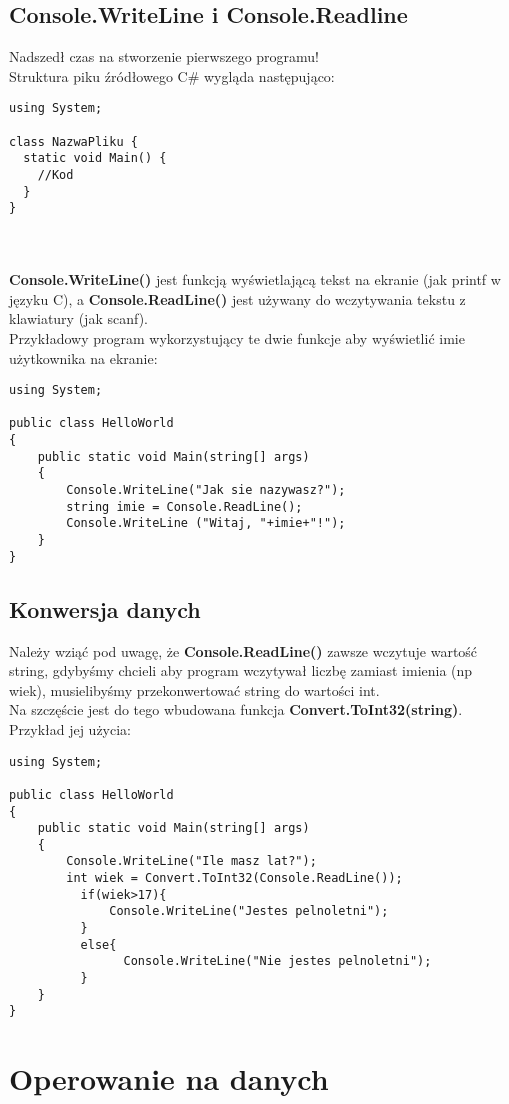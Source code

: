 \documentclass[a4paper]{article}
\theoremstyle{definition}
\begin{document}
\subsection{Console.WriteLine i Console.Readline}
Nadszedł czas na stworzenie pierwszego programu!
\\Struktura piku źródłowego C\# wygląda następująco:
\lstset{language=C}
\begin{lstlisting}[frame=single]
using System;

class NazwaPliku {
  static void Main() {
    //Kod
  }
}
\end{lstlisting}
\\	\\\textbf{Console.WriteLine()} jest funkcją wyświetlającą tekst na ekranie (jak printf w języku C), a \textbf{Console.ReadLine()} jest używany do wczytywania tekstu z klawiatury (jak scanf).
\\Przykładowy program wykorzystujący te dwie funkcje aby wyświetlić imie użytkownika na ekranie:
\lstset{language=C}
\begin{lstlisting}[frame=single]
using System;

public class HelloWorld
{
    public static void Main(string[] args)
    {
        Console.WriteLine("Jak sie nazywasz?");
        string imie = Console.ReadLine();
        Console.WriteLine ("Witaj, "+imie+"!");
    }
}
\end{lstlisting}
\subsection{Konwersja danych}
Należy wziąć pod uwagę, że \textbf{Console.ReadLine()} zawsze wczytuje wartość string, gdybyśmy chcieli aby program wczytywał liczbę zamiast imienia (np wiek), musielibyśmy przekonwertować string do wartości int.\\
Na szczęście jest do tego wbudowana funkcja \textbf{Convert.ToInt32(string)}. Przykład jej użycia:\\
\begin{lstlisting}[frame=single]
using System;

public class HelloWorld
{
    public static void Main(string[] args)
    {
        Console.WriteLine("Ile masz lat?");
        int wiek = Convert.ToInt32(Console.ReadLine());
	      if(wiek>17){
        	  Console.WriteLine("Jestes pelnoletni");
	      }
	      else{
		        Console.WriteLine("Nie jestes pelnoletni");
	      }
    }
}
\end{lstlisting}
\section{Operowanie na danych}
\end{document}
